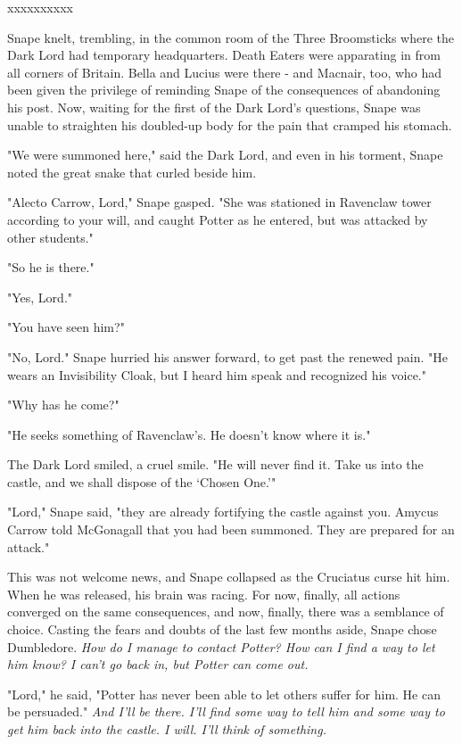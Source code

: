 \documentclass[a4paper,11pt]{article}
\begin{document}
xxxxxxxxxx

Snape knelt, trembling, in the common room of the Three Broomsticks where the Dark Lord had temporary headquarters. Death Eaters were apparating in from all corners of Britain. Bella and Lucius were there - and Macnair, too, who had been given the privilege of reminding Snape of the consequences of abandoning his post. Now, waiting for the first of the Dark Lord's questions, Snape was unable to straighten his doubled-up body for the pain that cramped his stomach.

"We were summoned here," said the Dark Lord, and even in his torment, Snape noted the great snake that curled beside him.

"Alecto Carrow, Lord," Snape gasped. "She was stationed in Ravenclaw tower according to your will, and caught Potter as he entered, but was attacked by other students."

"So he is there."

"Yes, Lord."

"You have seen him?"

"No, Lord." Snape hurried his answer forward, to get past the renewed pain. "He wears an Invisibility Cloak, but I heard him speak and recognized his voice."

"Why has he come?"

"He seeks something of Ravenclaw's. He doesn't know where it is."

The Dark Lord smiled, a cruel smile. "He will never find it. Take us into the castle, and we shall dispose of the `Chosen One.'"

"Lord," Snape said, "they are already fortifying the castle against you. Amycus Carrow told McGonagall that you had been summoned. They are prepared for an attack."

This was not welcome news, and Snape collapsed as the Cruciatus curse hit him. When he was released, his brain was racing. For now, finally, all actions converged on the same consequences, and now, finally, there was a semblance of choice. Casting the fears and doubts of the last few months aside, Snape chose Dumbledore. \emph{How do I manage to contact Potter? How can I find a way to let him know? I can't go back in, but Potter can come out.}

"Lord," he said, "Potter has never been able to let others suffer for him. He can be persuaded." \emph{And I'll be there. I'll find some way to tell him and some way to get him back into the castle. I will. I'll think of something.}
\end{document}
